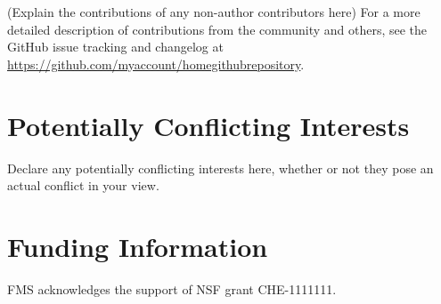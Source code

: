 \documentclass[9pt,comparison]{livecoms}
\newcommand{\githubrepository}{\url{https://github.com/myaccount/homegithubrepository}}  %
\begin{document}
(Explain the contributions of any non-author contributors here)
For a more detailed description of contributions from the community and others, see the GitHub issue tracking and changelog at \githubrepository.

\section{Potentially Conflicting Interests}

Declare any potentially conflicting interests here, whether or not they pose an actual conflict in your view.

\section{Funding Information}
FMS acknowledges the support of NSF grant CHE-1111111.




\end{document}
